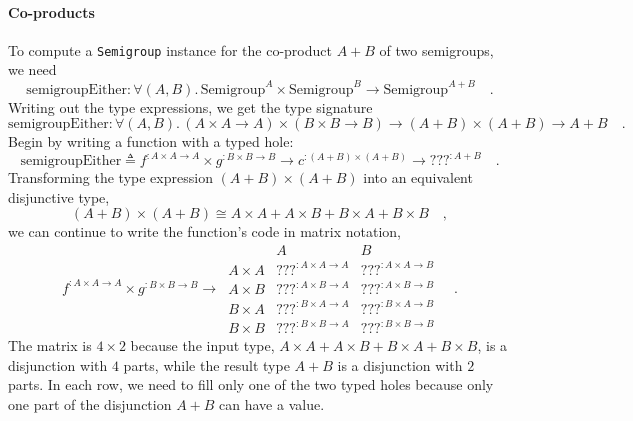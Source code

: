 \paragraph{Co-products}

To compute a \lstinline!Semigroup! instance for the co-product $A+B$
of two semigroups, we need
\[
\text{semigroupEither}:\forall(A,B).\,\text{Semigroup}^{A}\times\text{Semigroup}^{B}\rightarrow\text{Semigroup}^{A+B}\quad.
\]
Writing out the type expressions, we get the type signature
\[
\text{semigroupEither}:\forall(A,B).\,\left(A\times A\rightarrow A\right)\times\left(B\times B\rightarrow B\right)\rightarrow\left(A+B\right)\times\left(A+B\right)\rightarrow A+B\quad.
\]
Begin by writing a function with a typed hole:
\[
\text{semigroupEither}\triangleq f^{:A\times A\rightarrow A}\times g^{:B\times B\rightarrow B}\rightarrow c^{:\left(A+B\right)\times\left(A+B\right)}\rightarrow\text{???}^{:A+B}\quad.
\]
Transforming the type expression $\left(A+B\right)\times\left(A+B\right)$
into an equivalent disjunctive type,
\[
\left(A+B\right)\times\left(A+B\right)\cong A\times A+A\times B+B\times A+B\times B\quad,
\]
we can continue to write the function\textsf{'}s code in matrix notation,
\[
f^{:A\times A\rightarrow A}\times g^{:B\times B\rightarrow B}\rightarrow\,\begin{array}{|c||cc|}
 & A & B\\
\hline A\times A & \text{???}^{:A\times A\rightarrow A} & \text{???}^{:A\times A\rightarrow B}\\
A\times B & \text{???}^{:A\times B\rightarrow A} & \text{???}^{:A\times B\rightarrow B}\\
B\times A & \text{???}^{:B\times A\rightarrow A} & \text{???}^{:B\times A\rightarrow B}\\
B\times B & \text{???}^{:B\times B\rightarrow A} & \text{???}^{:B\times B\rightarrow B}
\end{array}\quad.
\]
The matrix is $4\times2$ because the input type, $A\times A+A\times B+B\times A+B\times B$,
is a disjunction with $4$ parts, while the result type $A+B$ is
a disjunction with $2$ parts. In each row, we need to fill only one
of the two typed holes because only one part of the disjunction $A+B$
can have a value.

